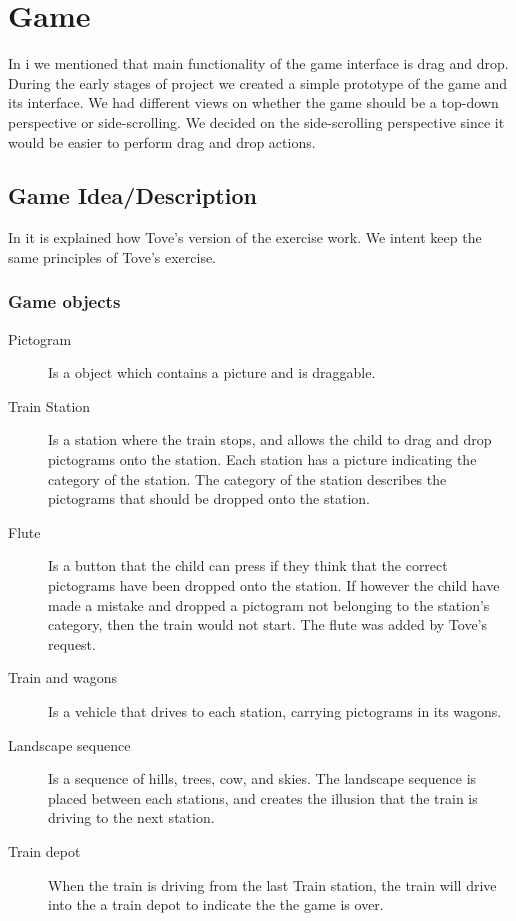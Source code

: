 \section{Game}
In  i we mentioned that main functionality of the game interface is drag and drop. During the early stages of project we created a simple prototype of the game and its interface. We had different views on whether the game should be a top-down perspective or side-scrolling. We decided on the side-scrolling perspective since it would be easier to perform drag and drop actions.
\subsection{Game Idea/Description}
In  it is explained how Tove's version of the exercise work. We intent keep the same principles of Tove's exercise.
\subsubsection*{Game objects}
\begin{description}
\item[Pictogram] Is a object which contains a picture and is draggable.
\item[Train Station] Is a station where the train stops, and allows the child to drag and drop pictograms onto the station. Each station has a picture indicating the category of the station. The category of the station describes the pictograms that should be dropped onto the station.  

\item[Flute] Is a button that the child can press if they think that the correct pictograms have been dropped onto the station. If however the child have made a mistake and dropped a pictogram not belonging to the station's category, then the train would not start. The flute was added by Tove's request.

\item[Train and wagons] Is a vehicle that drives to each station, carrying pictograms in its wagons.

\item[Landscape sequence] Is a sequence of hills, trees, cow, and skies. The landscape sequence is placed between each stations, and creates the illusion that the train is driving to the next station.
\item[Train depot] When the train is driving from the last Train station, the train will drive into the a train depot to indicate the the game is over.
\end{description}

